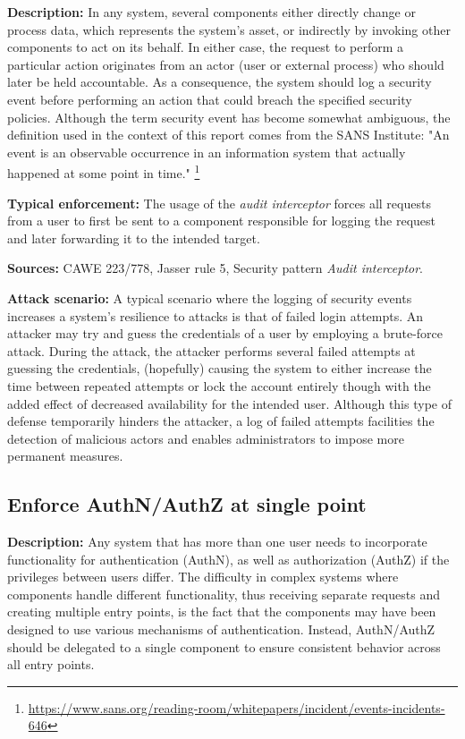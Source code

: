 \textbf{Description:} In any system, several components either directly change or process data, which represents the system's asset, or indirectly by invoking other components to act on its behalf. In either case, the request to perform a particular action originates from an actor (user or external process) who should later be held accountable.  As a consequence, the system should log a security event before performing an action that could breach the specified security policies. Although the term security event has become somewhat ambiguous, the definition used in the context of this report comes from the SANS Institute: "An event is an observable occurrence in an information system that actually happened at some point in time." \footnote{\url{https://www.sans.org/reading-room/whitepapers/incident/events-incidents-646}}

\textbf{Typical enforcement:} The usage of the \textit{audit interceptor} forces all requests from a user to first be sent to a component responsible for logging the request and later forwarding it to the intended target. 

\textbf{Sources:} CAWE 223/778, Jasser rule 5, Security pattern \textit{Audit interceptor}.

\textbf{Attack scenario:} A typical scenario where the logging of security events increases a system's resilience to attacks is that of failed login attempts. An attacker may try and guess the credentials of a user by employing a brute-force attack. During the attack, the attacker performs several failed attempts at guessing the credentials, (hopefully) causing the system to either increase the time between repeated attempts or lock the account entirely though with the added effect of decreased availability for the intended user. Although this type of defense temporarily hinders the attacker, a log of failed attempts facilities the detection of malicious actors and enables administrators to impose more permanent measures. 

\subsection{Enforce AuthN/AuthZ at single point} 
 
 \textbf{Description:} Any system that has more than one user needs to incorporate functionality for authentication (AuthN), as well as authorization (AuthZ) if the privileges between users differ. The difficulty in complex systems where components handle different functionality, thus receiving separate requests and creating multiple entry points, is the fact that the components may have been designed to use various mechanisms of authentication. Instead, AuthN/AuthZ should be delegated to a single component to ensure consistent behavior across all entry points. 
 
